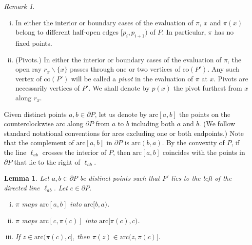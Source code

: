 \documentclass[11pt]{amsart}
\newtheorem{lemma}[theorem]{Lemma}
\theoremstyle{remark}
\newtheorem{remark}[theorem]{Remark}
\numberwithin{equation}{section}
\newcommand{\co}{\mathrm{co}}
\newcommand{\arc}{\mathrm{arc}}
\begin{document}
\begin{remark}\leavevmode
\begin{enumerate}[(i)]
\item
In either the interior or boundary cases of the evaluation of $\pi$, $x$ and $\pi(x)$ belong to different half-open edges $[p_i,p_{i+1})$ of $P$. In particular, $\pi$ has no fixed points.
\item (Pivots.)
In either the interior or boundary cases of the evaluation of $\pi$, the open ray $r_x\backslash\{x\}$ passes through one or two vertices of $\co(P')$. Any such vertex of $\co(P') $ will be called a  \emph{pivot} in the evaluation of $\pi$ at $x$. 
Pivots are necessarily vertices of $P'$. We shall denote by $p(x)$ the pivot furthest from $x$ along $r_x$.
\end{enumerate}
\end{remark}





Given distinct points $a,b\in\partial P$, let us denote by $\arc[a,b]$ the points on the counterclockwise arc along $\partial P$ from $a$ to $b$ including both $a$ and $b$. (We follow standard notational conventions for arcs excluding one or both endpoints.)  Note that the complement of $\arc[a,b]$ in $\partial P$ is $\arc(b,a)$. By the convexity of $P$, if the line $\ell_{ab}$ crosses the interior of $P$, then $\arc[a,b]$ coincides with the points in $\partial P$ that lie to the right of $\ell_{ab}$. 



\begin{lemma} \label{Fablemma} 
Let $a,b\in \partial P$ be distinct points such that $P'$ lies to the left of the directed line $\ell_{ab}$. Let $c\in\partial P$.
\begin{enumerate}[(i)]
\item 
$\pi$ maps   $\arc[a,b]$ into   $\arc[b,a)$. 

\item 
$\pi$ maps $\arc[c,\pi(c)]$ into $\arc[\pi(c),c)$. 

\item 
If $z\in \arc(\pi(c),c]$, then $\pi(z)\in \arc(z,\pi(c)]$.
\end{enumerate}
\end{lemma}
\end{document}
